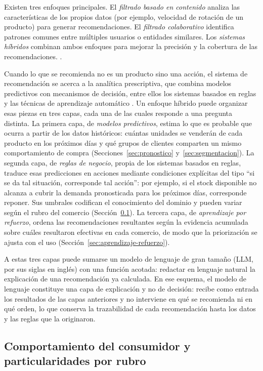 Existen tres enfoques principales. El \emph{filtrado basado en contenido} analiza las características de los propios datos (por ejemplo, velocidad de rotación de un producto) para generar recomendaciones. El \emph{filtrado colaborativo} identifica patrones comunes entre múltiples usuarios o entidades similares. Los \emph{sistemas híbridos} combinan ambos enfoques para mejorar la precisión y la cobertura de las recomendaciones. \parencite{Ricci2015, Adomavicius2005}.

Cuando lo que se recomienda no es un producto sino una acción, el sistema de recomendación se acerca a la analítica prescriptiva, que combina modelos predictivos con mecanismos de decisión, entre ellos los sistemas basados en reglas y las técnicas de aprendizaje automático \parencite{Lepenioti2020}. Un enfoque híbrido puede organizar esas piezas en tres capas, cada una de las cuales responde a una pregunta distinta. La primera capa, de \emph{modelos predictivos}, estima lo que es probable que ocurra a partir de los datos históricos: cuántas unidades se venderán de cada producto en los próximos días y qué grupos de clientes comparten un mismo comportamiento de compra (Secciones~\ref{sec:pronostico} y~\ref{sec:segmentacion}). La segunda capa, de \emph{reglas de negocio}, propia de los sistemas basados en reglas, traduce esas predicciones en acciones mediante condiciones explícitas del tipo \enquote{si se da tal situación, corresponde tal acción}: por ejemplo, si el stock disponible no alcanza a cubrir la demanda pronosticada para los próximos días, corresponde reponer. Sus umbrales codifican el conocimiento del dominio y pueden variar según el rubro del comercio (Sección~\ref{sec:comportamiento-consumidor}). La tercera capa, de \emph{aprendizaje por refuerzo}, ordena las recomendaciones resultantes según la evidencia acumulada sobre cuáles resultaron efectivas en cada comercio, de modo que la priorización se ajusta con el uso (Sección~\ref{sec:aprendizaje-refuerzo}).

A estas tres capas puede sumarse un modelo de lenguaje de gran tamaño (LLM, por sus siglas en inglés) con una función acotada: redactar en lenguaje natural la explicación de una recomendación ya calculada. En ese esquema, el modelo de lenguaje constituye una capa de explicación y no de decisión: recibe como entrada los resultados de las capas anteriores y no interviene en qué se recomienda ni en qué orden, lo que conserva la trazabilidad de cada recomendación hasta los datos y las reglas que la originaron.

\subsection{Comportamiento del consumidor y particularidades por rubro}
\label{sec:comportamiento-consumidor}

